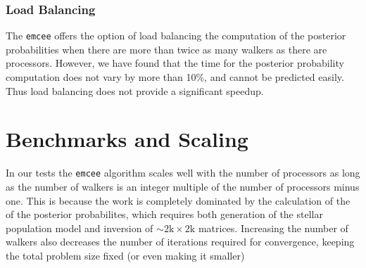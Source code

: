 \documentclass{article}
\begin{document}
\subsubsection{Load Balancing}
The \texttt{emcee} offers the option of load balancing the computation of the posterior probabilities when there are more than twice as many walkers as there are processors.  However, we have found that the time for the posterior probability computation does not vary by more than 10\%, and cannot be predicted easily. Thus load balancing does not provide a significant speedup. 

\section{Benchmarks and Scaling}
In our tests the \texttt{emcee} algorithm scales well with the number of processors as long as the number of walkers is an integer multiple of the number of processors minus one.  This is because the work is completely dominated by the calculation of the of the posterior probabilites, which requires both generation of the stellar population model and inversion of $\sim 2\mbox{k} \times 2\mbox{k}$ matrices.  Increasing the number of walkers also decreases the number of iterations required for convergence, keeping the total problem size fixed (or even making it smaller)
\end{document}
